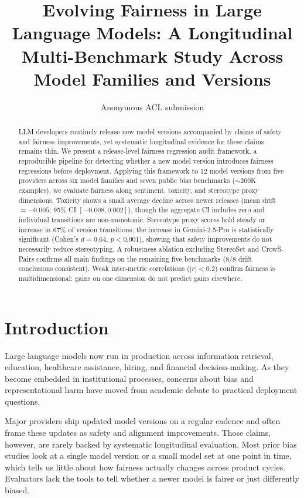 \documentclass[11pt]{article}
\title{Evolving Fairness in Large Language Models: A Longitudinal Multi-Benchmark Study Across Model Families and Versions}
\author{Anonymous ACL submission}
\begin{document}
\maketitle

\begin{abstract}
LLM developers routinely release new model versions accompanied by claims of safety and fairness improvements, yet systematic longitudinal evidence for these claims remains thin. We present a release-level fairness regression audit framework, a reproducible pipeline for detecting whether a new model version introduces fairness regressions before deployment. Applying this framework to 12 model versions from five providers across six model families and seven public bias benchmarks ($\sim$200K examples), we evaluate fairness along sentiment, toxicity, and stereotype proxy dimensions. Toxicity shows a small average decline across newer releases (mean drift $= {-0.005}$; 95\% CI $[-0.008, 0.002]$), though the aggregate CI includes zero and individual transitions are non-monotonic. Stereotype proxy scores hold steady or increase in 67\% of version transitions; the increase in Gemini-2.5-Pro is statistically significant (Cohen's $d = 0.64$, $p < 0.001$), showing that safety improvements do not necessarily reduce stereotyping. A robustness ablation excluding StereoSet and CrowS-Pairs confirms all main findings on the remaining five benchmarks (8/8 drift conclusions consistent). Weak inter-metric correlations ($|r| < 0.2$) confirm fairness is multidimensional: gains on one dimension do not predict gains elsewhere.
\end{abstract}

\section{Introduction}

Large language models now run in production across information retrieval, education, healthcare assistance, hiring, and financial decision-making. As they become embedded in institutional processes, concerns about bias and representational harm have moved from academic debate to practical deployment questions.

Major providers ship updated model versions on a regular cadence and often frame these updates as safety and alignment improvements. Those claims, however, are rarely backed by systematic longitudinal evaluation. Most prior bias studies look at a single model version or a small model set at one point in time, which tells us little about how fairness actually changes across product cycles. Evaluators lack the tools to tell whether a newer model is fairer or just differently biased.
\end{document}

